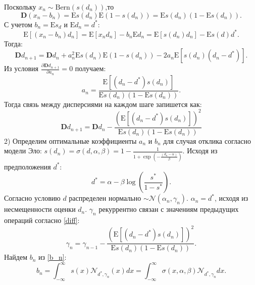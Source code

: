 \documentclass{mipt-thesis-bs}
\begin{document}
Поскольку $x_n \sim \text{Bern}(s(d_n))$,то
\begin{equation}
    \mathbf{D}(x_n-b_n) = \mathrm{E} s(d_n) \mathrm{E} (1-s(d_n))=  \mathrm{E} s(d_n)  (1-\mathrm{E}s(d_n)).
\end{equation}
С учетом $b_n = \mathrm{E} s_d$ и $\mathrm{E} d_n =d^*$:
\begin{equation}
    \mathrm{E}\left[(x_n-b_n)d_n\right] = \mathrm{E}\left[x_n d_n \right] - b_n  \mathrm{E} d_n = \mathrm{E} \left[s(d_n) d_n\right] - \mathrm{E} s(d) d^*.
\end{equation}
Тогда:
\begin{equation}
    \mathbf{D} d_{n+1} = \mathbf{D} d_n + a_n^2 \mathrm{E}s(d_n)\mathrm{E}(1-s(d_n)) - 2 a_n \mathrm{E}\left[ s(d_n) (d_n-d^*)\right].
\end{equation}
Из условия $\frac{\partial \mathbf{D}{d_{n+1}}}{\partial a_n} =0 $ получаем:
\begin{equation}
    \label{diff}
    a_n = \frac{\mathrm{E} \left[ (d_n-d^*) s(d_n)\right]}{\mathrm{E}s(d_n)(1 - \mathrm{E}s(d_n))}.
\end{equation}
Тогда связь между дисперсиями на каждом шаге запишется как:
\begin{equation}
    \mathbf{D} d_{n+1} = \mathbf{D} d_n - \frac{\left(\mathrm{E} \left[ (d_n-d^*) s(d_n)\right] \right)^2}{\mathrm{E}s(d_n)(1 - \mathrm{E}s(d_n))} 
\end{equation}
2) Определим оптимальные коэффициенты $a_n$ и $b_n$ для случая отклика согласно модели Эло: $s(d_n) = \sigma(d,\alpha,\beta) = 1 - \frac{1}{1+\exp(-\frac{(d_n-\alpha)}{\beta})}$. Исходя из предположения $d^*$:
\begin{equation}
    d^* = \alpha  - \beta \log\left(\frac{s^*}{1-s^*}\right).
\end{equation}
Согласно условию $d$ распределен нормально $\sim \mathcal{N}(\alpha_n,\gamma_n)$. $\alpha_n = d^*$, исходя из несмещенности оценки $d_n$. $\gamma_n$ рекуррентно связан с значениям предыдущих операций согласно \ref{diff}:
\begin{equation}
    \label{gamma_connection}
    \gamma_n = \gamma_{n-1} - \frac{\left(\mathrm{E} \left[ (d_n-d^*) s(d_n)\right] \right)^2}{\mathrm{E}s(d_n)(1 - \mathrm{E}s(d_n))}.
\end{equation}
Найдем $b_n$ из \ref{b_n}:
\begin{equation}
    b_n = \int_{-\infty}^{\infty} s(x) \mathcal{N}_{d^*,\gamma_n}(x) d x = \int_{-\infty}^{\infty} \sigma(x,\alpha,\beta) \mathcal{N}_{d^*,\gamma_n} d x.
\end{equation}
\end{document}
